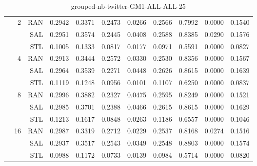 \begin{center}
\begin{table}[htbp]
\begin{tabular}{ | r | r | r | r | r | r | r | r | r | r | r |}
 & \multirow{3}{*}{2} & RAN & 0.2942 & 0.3371 & 0.2473 & 0.0266 & 0.2566 & 0.7992 & 0.0000 & 0.1540\\ \cline{3-11}
 &   & SAL & 0.2951 & 0.3574 & 0.2445 & 0.0408 & 0.2588 & 0.8385 & 0.0290 & 0.1576\\ \cline{3-11}
 &   & STL & 0.1005 & 0.1333 & 0.0817 & 0.0177 & 0.0971 & 0.5591 & 0.0000 & 0.0827\\ \cline{2-11}
 & \multirow{3}{*}{4} & RAN & 0.2913 & 0.3444 & 0.2572 & 0.0330 & 0.2530 & 0.8356 & 0.0000 & 0.1567\\ \cline{3-11}
 &   & SAL & 0.2964 & 0.3539 & 0.2271 & 0.0448 & 0.2626 & 0.8615 & 0.0000 & 0.1639\\ \cline{3-11}
 &   & STL & 0.1119 & 0.1248 & 0.0956 & 0.0101 & 0.1107 & 0.6250 & 0.0000 & 0.0837\\ \cline{2-11}
 & \multirow{3}{*}{8} & RAN & 0.2996 & 0.3882 & 0.2327 & 0.0475 & 0.2595 & 0.8249 & 0.0000 & 0.1521\\ \cline{3-11}
 &   & SAL & 0.2985 & 0.3701 & 0.2388 & 0.0466 & 0.2615 & 0.8615 & 0.0000 & 0.1629\\ \cline{3-11}
 &   & STL & 0.1213 & 0.1617 & 0.0848 & 0.0263 & 0.1186 & 0.6557 & 0.0000 & 0.1046\\ \cline{2-11}
 & \multirow{3}{*}{16} & RAN & 0.2987 & 0.3319 & 0.2712 & 0.0229 & 0.2537 & 0.8168 & 0.0274 & 0.1516\\ \cline{3-11}
 &   & SAL & 0.2937 & 0.3517 & 0.2543 & 0.0349 & 0.2548 & 0.8803 & 0.0000 & 0.1574\\ \cline{3-11}
 &   & STL & 0.0988 & 0.1172 & 0.0733 & 0.0139 & 0.0984 & 0.5714 & 0.0000 & 0.0820\\ \cline{2-11}
\hline
\end{tabular}
\caption{grouped-nb-twitter-GM1-ALL-ALL-25}
\end{table}
\end{center}

